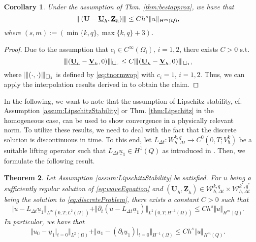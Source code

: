 \documentclass[sn-mathphys-num]{sn-jnl}
\newtheorem{thm}{Theorem}[section]
\newtheorem{cor}[thm]{Corollary}
\numberwithin{equation}{section}
\newcommand{\wop}{\square_c}
\newcommand{\tnorm}[1]{\vert\hspace{-0.3mm}\Vert#1\Vert\hspace{-0.3mm}\vert}
\newcommand{\FullyDiscrSpace}[2]{ W^{ {#1},{#2}}_{h, \Delta t  } }
\newcommand{\ProdFullyDiscrSpace}[2]{ \mathcal{W}^{ {#1},{#2}}_{h, \Delta t  } }
\newcommand{\Uh}{\underline{\mathbf{U}}_h}
\newcommand{\Vh}{\underline{\mathbf{V}}_h}
\newcommand{\Zh}{\underline{\mathbf{Z}}_h}
\newcommand{\ul}{\underline{u}}
\newcommand{\dt}{\partial_t}
\begin{document}
\begin{cor}\label{cor:tnormConvRates}
    Under the assumption of Thm. \ref{thm:bestapprox}, we have that
    \begin{equation*}
        \tnorm{(\mathbf{U} - \Uh,\Zh)} \le C h^s \Vert u \Vert_{H^m(Q)},
    \end{equation*}
    where $(s,m) := (\min\{ k,q \}, \max\{k,q\}+3)$. 
\end{cor}

\begin{proof}
    Due to the assumption that $c_i \in C^\infty(\Omega_i)$, $i = 1,2$, there exists $C > 0$ s.t.  
    \begin{equation*}
        \tnorm{(\Uh - \Vh, 0)}_{\wop} \le C \tnorm{(\Uh - \Vh, 0)}_{\square_1},
    \end{equation*}
    where $\tnorm{(\cdot, \cdot)}_{\square_1}$ is defined by \eqref{eq:tnormwop} with $c_i = 1$, $i = 1,2$. Thus, we can apply the interpolation results derived in \cite[Lemma 5]{BP24} to obtain the claim. 
\end{proof}


\noindent In the following, we want to note that the assumption of Lipschitz stability, cf. Assumption \ref{assum:LipschitzStability} or Thm. \ref{thm:Lipschitz} in the homogeneous case, can be used to show convergence in a physically relevant norm. To utilize these results, we need to deal with the fact that the discrete solution is discontinuous in time. To this end, let $L_{\Delta t} : \FullyDiscrSpace{k}{q} \rightarrow C^0(0,T;V_h^k)$ be a suitable lifting operator such that $L_{\Delta t} \ul_1 \in H^1(Q)$ as introduced in \cite[Sec. 4]{BP24}. Then, we formulate the following result.

\begin{thm}\label{thm:convergence}
    Let Assumption \ref{assum:LipschitzStability} be satisfied. For $u$ being a sufficiently regular solution of \eqref{eq:waveEquation} and $(\Uh,\Zh) \in \ProdFullyDiscrSpace{k}{q} \times \ProdFullyDiscrSpace{k^\ast}{q^\ast}$ being the solution to \eqref{eq:discreteProblem}, there exists a constant $C>0$ such that
    \begin{equation}
        \Vert u - L_{\Delta t} \ul_1 \Vert_{L^\infty(0,T;L^2(\Omega))} + \Vert \dt (u - L_{\Delta t} \ul_1) \Vert_{L^2(0,T;H^{-1}(\Omega))} \le C h^s \Vert u \Vert_{H^m(Q)}. 
    \end{equation}
    In particular, we have that 
    \begin{equation}
        \Vert u_0 - \ul_1 \vert_{t = 0} \Vert_{L^2(\Omega)} + \Vert u_1 - (\dt \ul_1) \vert_{t = 0} \Vert_{H^{-1}(\Omega)} \le C h^s \Vert u \Vert_{H^m(Q)}.
    \end{equation}
\end{thm}
\end{document}

